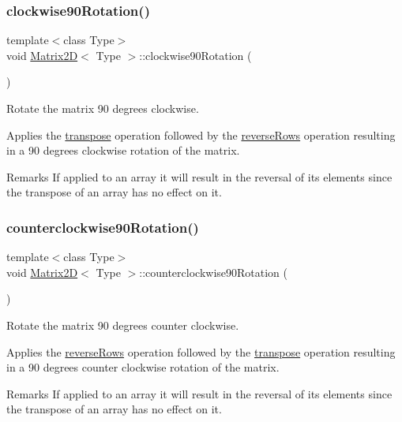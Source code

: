 \subsubsection{\texorpdfstring{clockwise90\+Rotation()}{clockwise90Rotation()}}
{\footnotesize\ttfamily template$<$class Type$>$ \\
void \mbox{\hyperlink{classMatrix2D}{Matrix2D}}$<$ Type $>$\+::clockwise90\+Rotation (\begin{DoxyParamCaption}{ }\end{DoxyParamCaption})\hspace{0.3cm}{\ttfamily [inline]}}



Rotate the matrix 90 degrees clockwise. 

Applies the \mbox{\hyperlink{classMatrix2D_a788abe5e1fbd6a1fbd0d445aca4f8300}{transpose}} operation followed by the \mbox{\hyperlink{classMatrix2D_aaaefe293f1a0549afb2e506b71b18490}{reverse\+Rows}} operation resulting in a 90 degrees clockwise rotation of the matrix. \begin{DoxyRemark}{Remarks}
If applied to an array it will result in the reversal of its elements since the transpose of an array has no effect on it. 
\end{DoxyRemark}
\mbox{\label{classMatrix2D_a3fc1bc77793995134f6d2a9095eb57cb}} 
\subsubsection{\texorpdfstring{counterclockwise90\+Rotation()}{counterclockwise90Rotation()}}
{\footnotesize\ttfamily template$<$class Type$>$ \\
void \mbox{\hyperlink{classMatrix2D}{Matrix2D}}$<$ Type $>$\+::counterclockwise90\+Rotation (\begin{DoxyParamCaption}{ }\end{DoxyParamCaption})\hspace{0.3cm}{\ttfamily [inline]}}



Rotate the matrix 90 degrees counter clockwise. 

Applies the \mbox{\hyperlink{classMatrix2D_aaaefe293f1a0549afb2e506b71b18490}{reverse\+Rows}} operation followed by the \mbox{\hyperlink{classMatrix2D_a788abe5e1fbd6a1fbd0d445aca4f8300}{transpose}} operation resulting in a 90 degrees counter clockwise rotation of the matrix. \begin{DoxyRemark}{Remarks}
If applied to an array it will result in the reversal of its elements since the transpose of an array has no effect on it. 
\end{DoxyRemark}
\mbox{\label{classMatrix2D_afd2fbe10a27044f6e716242fde6a645a}} 

